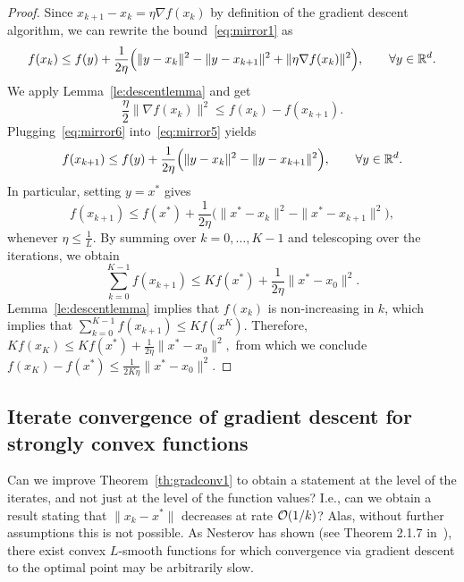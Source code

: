 \begin{proof}
Since $x_{k+1} - x_k = \eta \nabla f(x_k)$ by definition of the gradient descent algorithm, we can rewrite the bound~\eqref{eq:mirror1} as
\begin{equation}\label{eq:mirror5}
f(x_k) \le f(y) + \frac{1}{2\eta} \Big( \|y-x_k\|^2 - \|y-x_{k+1}\|^2  + \|\eta \nabla f(x_k)\|^2 \Big), \qquad \forall y \in \mathbb{R}^d.
\end{equation}
We apply Lemma~\ref{le:descentlemma} and get
\begin{equation}
    \label{eq:mirror6}
\frac{\eta}{2} \|\nabla f(x_k)\|^2 \le 
f(x_{k}) - f(x_{k+1}).
\end{equation}
Plugging~\eqref{eq:mirror6} into~\eqref{eq:mirror5} yields
\begin{equation}\label{eq:mirror7}
f(x_{k+1}) \le f(y) + \frac{1}{2\eta} \Big( \|y-x_k\|^2 - \|y-x_{k+1}\|^2 \Big), \qquad \forall y \in \mathbb{R}^d.
\end{equation}
In particular, setting $y=x^{*}$ gives
\begin{equation}\label{eq:mirror7}
f(x_{k+1}) \le f(x^*) + \frac{1}{2\eta} \Big( \|x^*-x_k\|^2 - \|x^*-x_{k+1}\|^2 \Big),
\end{equation}
whenever $\eta \le \frac{1}{L}$. By summing over $k=0,\dots,K-1$ and telescoping over the iterations, we obtain
\begin{equation}\label{eq:mirror8}
\sum_{k=0}^{K-1} f(x_{k+1}) \le K f(x^*) + \frac{1}{2\eta}  \|x^*-x_0\|^2.
\end{equation}
Lemma~\ref{le:descentlemma} implies that $f(x_k)$ is non-increasing in $k$, which implies that $\sum_{k=0}^{K-1} f(x_{k+1}) \le K f(x^K)$. Therefore,
$
K f(x_K) \le K f(x^*) + \frac{1}{2\eta}  \|x^*-x_0\|^2,
$
from which we conclude
$
f(x_K) - f(x^*) \le \frac{1}{2K\eta}  \|x^*-x_0\|^2$. 

\end{proof}

\subsection{Iterate convergence of gradient descent for strongly convex functions}\label{s:gd:PolyakLojasiewicz}

Can we improve Theorem~\ref{th:gradconv1} to obtain a statement
 at the level of the iterates, and not just at the level of the function values? I.e., can we obtain a result stating that $\|x_k - x^*\|$
 decreases at rate ${\mathcal{O}}(1/k)$?  Alas, without further assumptions this is not possible. As Nesterov has shown (see Theorem 2.1.7 in~\cite{nesterov2018lectures}), there exist convex $L$-smooth functions for which convergence via gradient descent to the optimal point may be arbitrarily slow.





